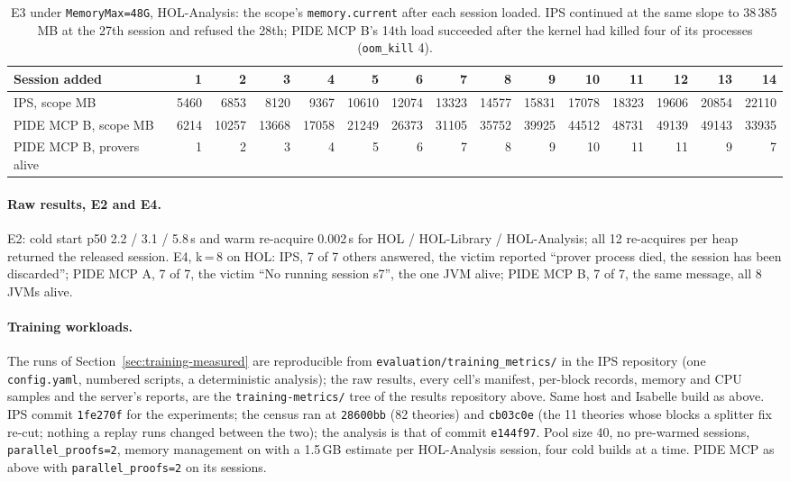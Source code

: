 \documentclass[11pt]{article}
\newcommand{\code}[1]{\colorbox{gray!12}{\texttt{\vphantom{Ag}#1}}}
\begin{document}
\begin{table}[!htb]
\centering\scriptsize
\setlength{\tabcolsep}{3.5pt}
\begin{tabular}{@{}l rrrrrrrrrrrrrr@{}}
\toprule
Session added & 1 & 2 & 3 & 4 & 5 & 6 & 7 & 8 & 9 & 10 & 11 & 12 & 13 & 14 \\
\midrule
IPS, scope MB & 5460 & 6853 & 8120 & 9367 & 10610 & 12074 & 13323 & 14577 & 15831 & 17078 & 18323 & 19606 & 20854 & 22110 \\
PIDE MCP B, scope MB & 6214 & 10257 & 13668 & 17058 & 21249 & 26373 & 31105 & 35752 & 39925 & 44512 & 48731 & 49139 & 49143 & 33935 \\
PIDE MCP B, provers alive & 1 & 2 & 3 & 4 & 5 & 6 & 7 & 8 & 9 & 10 & 11 & 11 & 9 & 7 \\
\bottomrule
\end{tabular}
\caption{E3 under \code{MemoryMax=48G}, HOL-Analysis: the scope's
  \code{memory.current} after each session loaded. IPS continued at the
  same slope to 38\,385\,MB at the 27th session and refused the 28th;
  PIDE MCP B's 14th load succeeded after the kernel had killed four of its
  processes (\code{oom\_kill} 4).}
\label{tab:raw-e3}
\end{table}

\paragraph{Raw results, E2 and E4.} E2: cold start p50 2.2 / 3.1 / 5.8\,s
and warm re-acquire 0.002\,s for HOL / HOL-Library / HOL-Analysis; all
12 re-acquires per heap returned the released session. E4, k\,=\,8 on
HOL: IPS, 7 of 7 others answered, the victim reported ``prover process
died, the session has been discarded''; PIDE MCP A, 7 of 7, the victim
``No running session s7'', the one JVM alive; PIDE MCP B, 7 of 7, the
same message, all 8 JVMs alive.

\paragraph{Training workloads.}
\label{app:bench-training}
The runs of Section~\ref{sec:training-measured} are reproducible from
\code{evaluation/training\_metrics/} in the IPS repository (one
\code{config.yaml}, numbered scripts, a deterministic analysis); the raw
results, every cell's manifest, per-block records, memory and CPU samples
and the server's reports, are the \code{training-metrics/} tree of the
results repository above. Same host and Isabelle build as above. IPS
commit \code{1fe270f} for the experiments; the census ran at
\code{28600bb} (82 theories) and \code{cb03c0e} (the 11 theories whose
blocks a splitter fix re-cut; nothing a replay runs changed between the
two); the analysis is that of commit \code{e144f97}. Pool size 40, no
pre-warmed sessions,
\code{parallel\_proofs=2}, memory management on with a 1.5\,GB estimate per
HOL-Analysis session, four cold builds at a time. PIDE MCP as above with
\code{parallel\_proofs=2} on its sessions.
\end{document}
